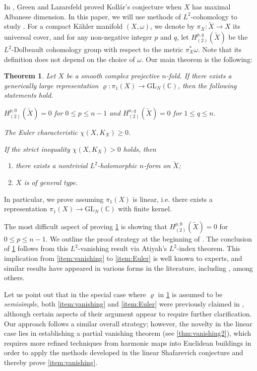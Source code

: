 \documentclass[11pt,a4paper,english]{smfart}
\theoremstyle{plain}
\newtheorem{thmx}{Theorem}
\theoremstyle{definition}
\theoremstyle{plain}
\newcommand\GL{\mathrm{GL}}
\def\bC{\mathbb{C}}
\begin{document}
In \cite{GL87}, Green and Lazarsfeld  proved Koll\'ar's conjecture when $X$ has maximal Albanese dimension.   In this paper, we will use  methods of $L^2$-cohomology to study  . For a compact  K\"ahler manifold $(X,\omega)$, we denote by $\pi_X:\widetilde{X}\to X$ its universal cover, and  for any non-negative integer $p$ and $q$,  let  $H_{(2)}^{p,q}(\widetilde{X})$ be  the  $L^2$-Dolbeault cohomology group  with respect to the metric $\pi_X^*\omega$. Note that its  definition does not depend on the choice of $\omega$.
	Our main theorem is the following:	\begin{thmx}\label{main:kollar}
		Let $X$ be a  smooth complex projective  $n$-fold. If there exists a generically large representation $\varrho:\pi_1(X)\to \GL_N(\bC)$, then the following statements hold.
		    \begin{thmenum} 
			\item  \label{item:vanishing} $H^{p,0}_{(2)}(\widetilde{X})=0$   for  $0\leq p\leq n-1$ and $H^{n,q}_{(2)}(\widetilde{X})=0$ for  $1\leq q\leq n$. 
			\item \label{item:Euler}The Euler characteristic $\chi(X, K_X)\geq 0$.
			\item  \label{item:strict} If the strict inequality $\chi(X,K_X)>0$ holds, then 
			\begin{enumerate}[label*=(\alph*)]
				\item \label{item:converse2}there exists  {a nontrivial} $L^2$-holomorphic $n$-form on $\widetilde{X}$;
				\item  \label{item:converse} $X$ is of general type. 
			\end{enumerate} 
		\end{thmenum}
	\end{thmx}
	In particular, we prove  assuming $\pi_1(X)$ is linear, i.e. there exists a representation $ \pi_1(X)\to \GL_N(\bC)$ with finite kernel. 
	
	The most difficult aspect of proving \cref{main:kollar} is  showing that $H^{p,0}_{(2)}(\widetilde{X})=0$   for  $0\leq p\leq n-1$. We  outline the proof strategy at the beginning of  . The  conclusion of \cref{main:kollar} follows from this $L^2$-vanishing result via Atiyah's $L^2$-index theorem. This  implication from \cref{item:vanishing} to \cref{item:Euler} is well known to experts, and similar results have  appeared in various forms in the literature, including \cite{Gr,CD01,Eys99,Eys00,Tak04,JZ}, among others.
	
Let us point out that in the special case where $\varrho$ in \cref{main:kollar} is assumed to be \emph{semisimple}, both \cref{item:vanishing} and \cref{item:Euler} were previously claimed in \cite{JZ}, although certain aspects of their argument appear to require further clarification. Our approach follows a similar overall strategy; however, the novelty in the linear case lies in establishing a partial vanishing theorem  (see \cref{thm:vanishing2}), which requires more refined techniques from harmonic maps into Euclidean buildings  in order to apply the methods developed in the linear Shafarevich conjecture \cite{EKPR12} and thereby prove \cref{item:vanishing}.
	\iffalse
\end{document}
